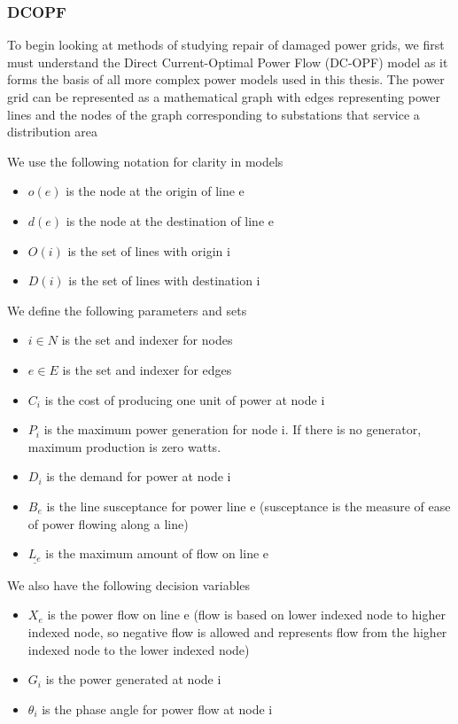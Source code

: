 \documentclass{article}
\begin{document}
	\subsubsection{DCOPF}
		To begin looking at methods of studying repair of damaged power grids, we first must understand the Direct Current-Optimal Power Flow (DC-OPF) model as it forms the basis of all more complex power models used in this thesis. The power grid can be represented as a mathematical graph with edges representing power lines and the nodes of the graph corresponding to substations that service a distribution area
		
		
		We use the following notation for clarity in models
	\begin{itemize}
		\item $o(e)$ is the node at the origin of line e
		\item $d(e)$ is the node at the destination of line e
		\item $O(i)$ is the set of lines with origin i
		\item $D(i)$ is the set of lines with destination i
	\end{itemize}
	We define the following parameters and sets
	\begin{itemize}
		\item $i \in N$ is the set and indexer for nodes
		\item $e \in E$ is the set and indexer for edges
		\item $C_i$ is the cost of producing one unit of power at node i
		\item $P_i$ is the maximum power generation for node i. If there is no generator, maximum production is zero watts.
		\item $D_i$ is the demand for power at node i
		\item $B_e$ is the line susceptance for power line e (susceptance is the measure of ease of power flowing along a line)
		\item $\underline{L_e}$ is the maximum amount of flow on line e
	
	\end{itemize}
	We also have the following decision variables
	\begin{itemize}
	\item $X_e$ is the power flow on line e (flow is based on lower indexed node to higher indexed node, so negative flow is allowed and represents flow from the higher indexed node to the lower indexed node)
	\item $G_i$ is the power generated at node i
	\item $\theta_i$ is the phase angle for power flow at node i 
	\end{itemize}
\end{document}
